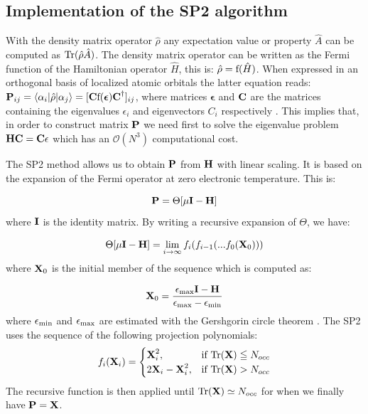 \subsection{Implementation of the SP2 algorithm}

With the density matrix operator $\hat{\rho}$ any expectation value or property $\hat{A}$ can be computed as $\mathrm{Tr}(\hat{\rho} \hat{A})$.
%
The density matrix operator can be written as the Fermi function of the Hamiltonian operator $\hat{H}$, this is:   $\hat{\rho} =   \mathrm{f}(\hat{H})$. When expressed in an orthogonal basis of localized atomic orbitals the latter equation reads:
$\textbf{P}_{ij} = \langle \alpha_i |\hat{\rho}| \alpha_j \rangle= [\textbf{C}\mathrm{f}(\bm{\epsilon})\textbf{C}^\dagger]_{ij}$, where matrices $\bm{\epsilon}$ and $\textbf{C}$ are the matrices containing the eigenvalues $\epsilon_i$ and eigenvectors $C_{i}$ respectively \cite{Sakurai}. This implies that, in order to construct matrix $\textbf{P}$ we need first to solve the eigenvalue problem $\textbf{H} \textbf{C} = \textbf{C} \epsilon$ which has an $\mathcal{O}(N^3)$ computational cost.

The SP2 method allows us to obtain $\textbf{P}$ from $\textbf{H}$ with linear scaling. It is based on the expansion of the Fermi operator at zero electronic temperature. This is: 

\begin{equation}
  \textbf{P} =   \Theta[\mu \textbf{I} - \textbf{H}]
\end{equation}
%
where $\textbf{I}$ is the identity matrix. By writing a recursive expansion of $\Theta$, we have: 


\begin{equation}
  \Theta[\mu \textbf{I} - \textbf{H}] =   \lim_{i \rightarrow \infty} f_i(f_{i-1}(...f_0(\textbf{X}_0)))
\end{equation}
%
where $\textbf{X}_0$ is the initial member of the sequence which is computed as: 

\begin{equation}
  \textbf{X}_0 = \frac{\epsilon_{\mathrm{max}} \textbf{I} - \textbf{H}}{\epsilon_{\mathrm{max}} - \epsilon_{\mathrm{min}}} 
\end{equation}
%
where $\epsilon_{\mathrm{min}}$ and $\epsilon_{\mathrm{max}}$ are estimated with the Gershgorin circle theorem \cite{GGolub96}. The SP2 uses the sequence of the following projection polynomials: 
%
\begin{equation}
  f_i(\textbf{X}_i) = \begin{cases} 
    \textbf{X}_i^2, & \mbox{if } \mathrm{Tr}(\textbf{X}) \leqq N_{occ} \\ 
    2\textbf{X}_i - \textbf{X}_i^2, & \mbox{if } \mathrm{Tr}(\textbf{X}) > N_{occ}
  \end{cases}
\end{equation}
%
The recursive function is then applied until $\mathrm{Tr}(\textbf{X}) \simeq N_{occ}$ for when we finally have $\textbf{P} = \textbf{X}$.

